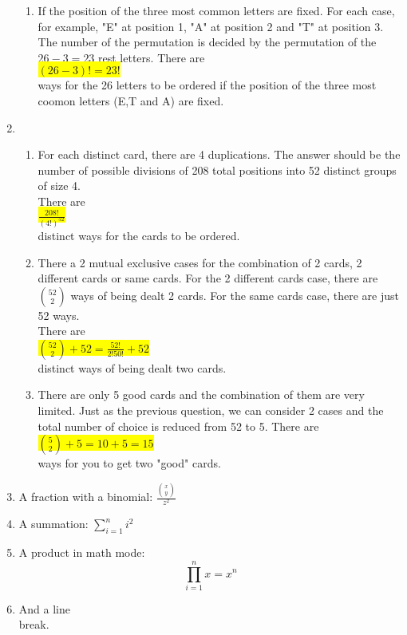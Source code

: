 \documentclass{article}
\begin{document}
\begin{enumerate}
\begin{enumerate}
		\item
		\mysolu
		If the position of the three most common letters are fixed. For each case, for example, "E" at position 1, "A" at position 2 and "T" at position 3. The number of the permutation is decided by the permutation of the ${26 - 3 = 23}$ rest letters.
		\myansw
		There are\\
		\colorbox{yellow}{
			${(26-3)! = 23!}$
		}\\
		ways for the 26 letters to be ordered if the position of the three most coomon letters (E,T and A) are fixed.\\
		
		
	\end{enumerate}

	\item
	\begin{enumerate}
		\item
		\mysolu
		For each distinct card, there are 4 duplications. The answer should be the number of possible divisions of 208 total positions into 52 distinct groups of size 4.\\
		\myansw
		There are\\
		\colorbox{yellow}{
			${\frac{208!}{(4!)^{52}}}$
		}\\
		distinct ways for the cards to be ordered.\\
		
		\item
		\mysolu
		There a 2 mutual exclusive cases for the combination of 2 cards, 2 different cards or same cards. For the 2 different cards case, there are ${{52 \choose 2}}$ ways of being dealt 2 cards. For the same cards case, there are just 52 ways.\\
		\myansw
		There are\\
		\colorbox{yellow}{
			${{52 \choose 2}+52 = \frac{52!}{2!50!}+52}$
		}\\
		distinct ways of being dealt two cards.
		
		\item
		\mysolu
		There are only 5 good cards and the combination of them are very limited. Just as the previous question, we can consider 2 cases and the total number of choice is reduced from 52 to 5.
		\myansw
		There are\\
		\colorbox{yellow}{
			${{5 \choose 2}+5 = 10 + 5 = 15}$
		}\\
		ways for you to get two "good" cards.
		
		
	
	\end{enumerate}
	\item A fraction with a binomial: $\frac{{x \choose y}}{z^2}$
	\item A summation: $\sum\limits_{i=1}^n i^2$
	
	\item A product in math mode: \[\prod\limits_{i=1}^n x = x^n\]
	
	\item And a line \\ break.


\end{enumerate}

\newpage
\end{document}
